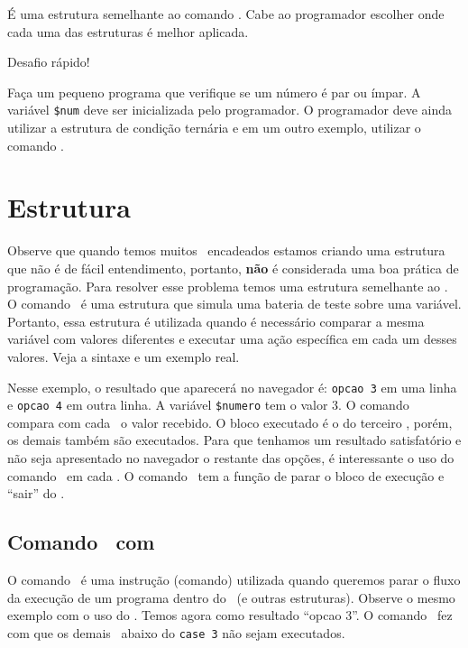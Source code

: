 É uma estrutura semelhante ao comando \comandoifelse. Cabe ao programador escolher onde
cada uma das estruturas é melhor aplicada.

\begin{framed}
{\Large Desafio rápido!}

Faça um pequeno programa que verifique se um número é par ou ímpar. A variável
\texttt{\$num} deve ser inicializada pelo programador. O programador deve ainda
utilizar a estrutura de condição ternária e em um outro exemplo, utilizar o comando
\comandoifelse.
\end{framed}

\section{Estrutura \comandoswitch}
\label{estrutura-switch}

Observe que quando temos muitos \comandoifelse~encadeados estamos criando uma estrutura 
que não é de fácil entendimento, portanto, \textbf{não} é considerada uma boa prática de 
programação. Para resolver esse problema temos uma estrutura semelhante ao \comandoifelse. 
O comando \comandoswitch~é uma estrutura que simula uma bateria de teste sobre uma variável. 
Portanto, essa estrutura é utilizada quando é  necessário comparar a mesma variável 
com valores diferentes e executar uma ação específica em cada um desses valores. Veja
a sintaxe e um exemplo real.



Nesse exemplo, o resultado que aparecerá no navegador é: \texttt{opcao 3} em uma linha e \texttt{opcao 4}
em outra linha. A variável \texttt{\$numero} tem o valor 3.  O comando \comandoswitch~
compara com cada \comandocase~o valor recebido. O bloco executado é o do terceiro \comandocase, 
porém, os demais também são executados. Para que tenhamos um resultado satisfatório e não seja
apresentado no navegador o restante das opções, é interessante o uso do comando \comandobreak~em 
cada \comandocase. O comando \comandobreak~tem a função de parar o bloco de execução e ``sair''
do \comandoswitch.

\subsection{Comando \comandoswitch~com \comandobreak}
\label{comando-switch-com-break}

O comando \comandobreak~é uma instrução (comando) utilizada quando queremos parar o fluxo da 
execução de um programa dentro do \comandoswitch~(e outras estruturas).
Observe o mesmo exemplo com o uso do \comandobreak. Temos agora como resultado ``opcao 3''. 
O comando \comandobreak~fez com que os demais \comandocase~abaixo do \texttt{case 3} 
não sejam executados.

